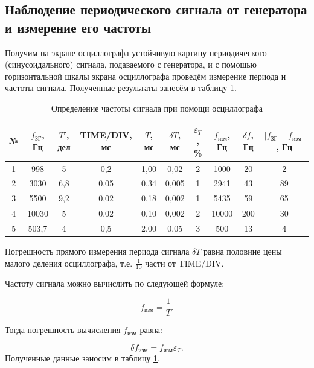 \documentclass[a4paper,12pt]{article} %
\begin{document}
\subsection{Наблюдение периодического сигнала от генератора и измерение его частоты}

Получим на экране осциллографа устойчивую картину периодического (синусоидального) сигнала, подаваемого с генератора, и с помощью горизонтальной шкалы экрана осциллографа проведём измерение периода и частоты сигнала. Полученные результаты занесём в таблицу \ref{tab:chastota}.

\begin{table}[H]
	\centering
	\begin{tabular}{|c|c|c|c|c|c|c|c|c|c|}
		\hline
		№ & $ f_\text{ЗГ} $, Гц & $ T' $, дел & TIME/DIV, мс & $ T $, мс & $ \delta T $, мс & $ \varepsilon_T $, \% & $ f_\text{изм} $, Гц & $ \delta f $, Гц & $ \left| f_\text{ЗГ} - f_\text{изм} \right| $, Гц \\ \hline
		1 & 998 & 5 & 0,2 & 1,00 & 0,02 & 2 & 1000 & 20 & 2 \\ \hline
		2 & 3030 & 6,8 & 0,05 & 0,34 & 0,005 & 1 & 2941 & 43 & 89 \\ \hline
		3 & 5500 & 9,2 & 0,02 & 0,18 & 0,002 & 1 & 5435 & 59 & 65 \\ \hline
		4 & 10030 & 5 & 0,02 & 0,10 & 0,002 & 2 & 10000 & 200 & 30 \\ \hline
		5 & 503,7 & 4 & 0,5 & 2,00 & 0,05 & 3 & 500 & 13 & 4 \\ \hline
	\end{tabular}
	\caption{Определение частоты сигнала при помощи осциллографа}
	\label{tab:chastota}
\end{table}

Погрешность прямого измерения периода сигнала $ \delta T $ равна половине цены малого деления осциллографа, т.е. $ \frac{1}{10} $ части от TIME/DIV.

Частоту сигнала можно вычислить по следующей формуле:

\begin{equation}
f_\text{изм} = \frac{1}{T}.
\end{equation}

Тогда погрешность вычисления $ f_\text{изм} $ равна:

\begin{equation}
\delta f_\text{изм} = f_\text{изм}\varepsilon_T.
\end{equation}
Полученные данные заносим в таблицу \ref{tab:chastota}.
\end{document}
